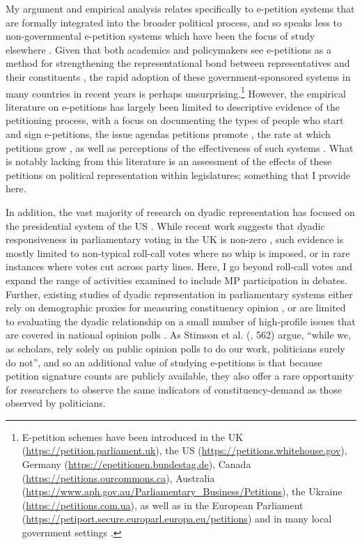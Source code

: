 \documentclass[12pt]{article}
\begin{document}
My argument and empirical analysis relates specifically to e-petition systems that are formally integrated into the broader political process, and so speaks less to non-governmental e-petition systems which have been the focus of study elsewhere \citep{halpin2018online}. Given that both academics and policymakers see e-petitions as a method for strengthening the representational bond between representatives and their constituents \citep{hough2012legislative, bochel2012petitions, kennedy2013electronic, committee2014epetitions}, the rapid adoption of these government-sponsored systems in many countries in recent years is perhaps unsurprising.\footnote{E-petition schemes have been introduced in the UK (\url{https://petition.parliament.uk}), the US (\url{https://petitions.whitehouse.gov}), Germany (\url{https://epetitionen.bundestag.de}), Canada (\url{https://petitions.ourcommons.ca}), Australia (\url{https://www.aph.gov.au/Parliamentary_Business/Petitions}), the Ukraine (\url{https://petitions.com.ua}), as well as in the European Parliament (\url{https://petiport.secure.europarl.europa.eu/petitions}) and in many local government settings \citep{hough2012legislative}.} However, the empirical literature on e-petitions has largely been limited to descriptive evidence of the petitioning process, with a focus on documenting the types of people who start \citep{wright2015populism} and sign \citep{jungherr2010political} e-petitions, the issue agendas petitions promote \citep{hersh2018postmaterialist}, the rate at which petitions grow \citep{yasseri2017rapid}, as well as perceptions of the effectiveness of such systems \citep{escher2017petitioning}. What is notably lacking from this literature is an assessment of the effects of these petitions on political representation within legislatures; something that I provide here.
 
In addition, the vast majority of research on dyadic representation has focused on the presidential system of the US \citep{miller1963constituency, kastellec2010public, krimmel2016gay}. While recent work suggests that dyadic responsiveness in parliamentary voting in the UK is non-zero \citep{hanretty2016dyadic}, such evidence is mostly limited to non-typical roll-call votes where no whip is imposed, or in rare instances where votes cut across party lines. Here, I go beyond roll-call votes and expand the range of activities examined to include MP participation in debates. Further, existing studies of dyadic representation in parliamentary systems either rely on demographic proxies for measuring constituency opinion \citep{hibbing1987accounting, soroka2009constituency,blidook2011constituency}, or are limited to evaluating the dyadic relationship on a small number of high-profile issues that are covered in national opinion polls \citep{hanretty2016dyadic}. As Stimson et al. (\citeyear{stimson1995dynamic}, 562) argue, ``while we, as scholars, rely solely on public opinion polls to do our work, politicians surely do not'', and so an additional value of studying e-petitions is that because petition signature counts are publicly available, they also offer a rare opportunity for researchers to observe the same indicators of constituency-demand as those observed by politicians.
\end{document}
